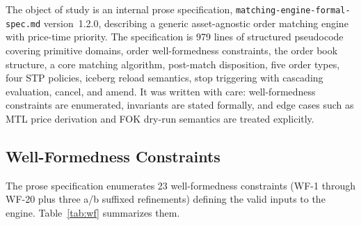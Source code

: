 \documentclass[11pt,a4paper]{article}
\begin{document}
The object of study is an internal prose specification,
\texttt{matching-engine-formal-spec.md} version~1.2.0, describing a
generic asset-agnostic order matching engine with price-time priority.
The specification is 979 lines of structured pseudocode covering
primitive domains, order well-formedness constraints, the order book
structure, a core matching algorithm, post-match disposition, five order
types, four STP policies, iceberg reload semantics, stop triggering with
cascading evaluation, cancel, and amend. It was written with care:
well-formedness constraints are enumerated, invariants are stated
formally, and edge cases such as MTL price derivation and FOK dry-run
semantics are treated explicitly.

\subsection{Well-Formedness Constraints}
\label{sec:wf}

The prose specification enumerates 23 well-formedness constraints
(WF-1 through WF-20 plus three a/b suffixed refinements) defining the
valid inputs to the engine. Table~\ref{tab:wf} summarizes them.
\end{document}
